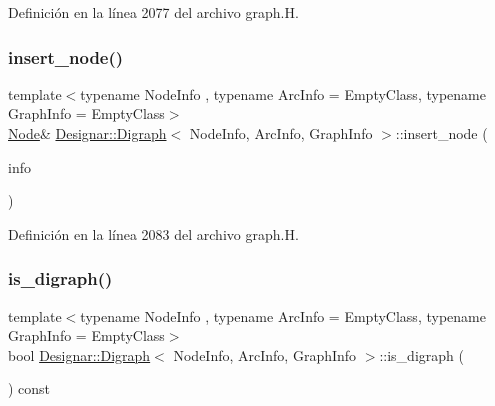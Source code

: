 Definición en la línea 2077 del archivo graph.\+H.

\mbox{\label{class_designar_1_1_digraph_a6b099922c3891b2c9fce75ffeedba025}} 
\subsubsection{\texorpdfstring{insert\+\_\+node()}{insert\_node()}\hspace{0.1cm}{\footnotesize\ttfamily [4/4]}}
{\footnotesize\ttfamily template$<$typename Node\+Info , typename Arc\+Info  = Empty\+Class, typename Graph\+Info  = Empty\+Class$>$ \\
\hyperlink{class_designar_1_1_digraph_a4dc921c41a480b7946a04170e997d8ae}{Node}\& \hyperlink{class_designar_1_1_digraph}{Designar\+::\+Digraph}$<$ Node\+Info, Arc\+Info, Graph\+Info $>$\+::insert\+\_\+node (\begin{DoxyParamCaption}\item[{Node\+Info \&\&}]{info }\end{DoxyParamCaption})\hspace{0.3cm}{\ttfamily [inline]}}



Definición en la línea 2083 del archivo graph.\+H.

\mbox{\label{class_designar_1_1_digraph_a6751952e13a35cf7aa452a8bb243f53d}} 
\subsubsection{\texorpdfstring{is\+\_\+digraph()}{is\_digraph()}}
{\footnotesize\ttfamily template$<$typename Node\+Info , typename Arc\+Info  = Empty\+Class, typename Graph\+Info  = Empty\+Class$>$ \\
bool \hyperlink{class_designar_1_1_digraph}{Designar\+::\+Digraph}$<$ Node\+Info, Arc\+Info, Graph\+Info $>$\+::is\+\_\+digraph (\begin{DoxyParamCaption}{ }\end{DoxyParamCaption}) const\hspace{0.3cm}{\ttfamily [inline]}}



